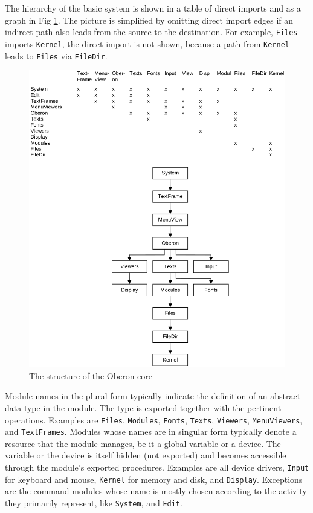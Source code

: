 The hierarchy of the basic system is shown in a table of direct imports and as a graph in
Fig \ref{fig:structure}. The picture is simplified by omitting direct import edges if an
indirect path also leads from the source to the destination. For example, \verb|Files|
imports \verb|Kernel|, the direct import is not shown, because a path from \verb|Kernel|
leads to \verb|Files| via \verb|FileDir|.
\begin{figure}[h!]
  \centering
  \includegraphics[width=.95\textwidth]{i/2.png}
  \caption{The structure of the Oberon core}
  \label{fig:structure}
\end{figure}

Module names in the plural form typically indicate the definition of an abstract data type
in the module. The type is exported together with the pertinent operations. Examples are
\verb|Files|, \verb|Modules|, \verb|Fonts|, \verb|Texts|, \verb|Viewers|, \verb|MenuViewers|,
and \verb|TextFrames|. Modules whose names are in singular form typically denote a resource
that the module manages, be it a global variable or a device. The variable or the device is
itself hidden (not exported) and becomes accessible through the module's exported procedures.
Examples are all device drivers, \verb|Input| for keyboard and mouse, \verb|Kernel| for
memory and disk, and \verb|Display|. Exceptions are the command modules whose name is mostly
chosen according to the activity they primarily represent, like \verb|System|, and \verb|Edit|.

